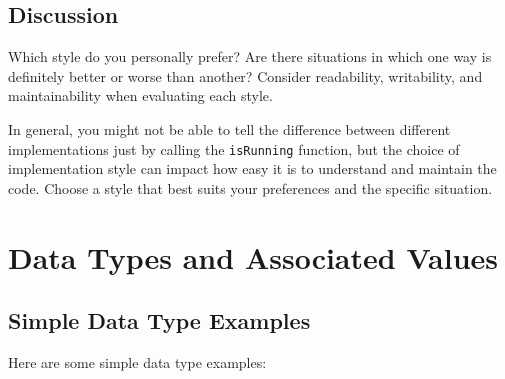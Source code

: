 \hypertarget{discussion}{%
\subsection{Discussion}\label{discussion}}

Which style do you personally prefer? Are there situations in which one
way is definitely better or worse than another? Consider readability,
writability, and maintainability when evaluating each style.

In general, you might not be able to tell the difference between
different implementations just by calling the \texttt{isRunning}
function, but the choice of implementation style can impact how easy it
is to understand and maintain the code. Choose a style that best suits
your preferences and the specific situation.

\hypertarget{data-types-and-associated-values}{%
\section{Data Types and Associated
Values}\label{data-types-and-associated-values}}

\hypertarget{simple-data-type-examples}{%
\subsection{Simple Data Type Examples}\label{simple-data-type-examples}}

Here are some simple data type examples:

\begin{Shaded}
\begin{Highlighting}[]
  \OtherTok{=}  \OperatorTok{|}  \NormalTok{ (}\NormalTok{, }\NormalTok{)}

  \OtherTok{=}  \OperatorTok{|}  \OperatorTok{|}  \OperatorTok{|} 
       \NormalTok{ (}\NormalTok{, }\NormalTok{)}

  
\OtherTok{=}  
    \OperatorTok{|}  
    \OperatorTok{|} 
    \NormalTok{ (}\NormalTok{, }\NormalTok{)}
\end{Highlighting}
\end{Shaded}

